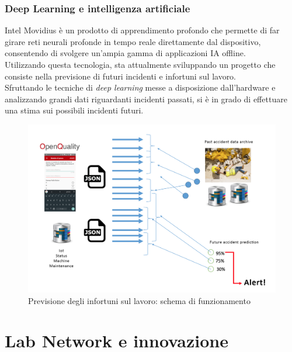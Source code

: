 \subsubsection{Deep Learning e intelligenza artificiale}
Intel Movidius è un prodotto di apprendimento profondo che permette di far girare reti neurali profonde in tempo reale direttamente dal dispositivo, consentendo di svolgere un'ampia gamma di applicazioni IA offline.\\
Utilizzando questa tecnologia, \lab{} sta attualmente sviluppando un progetto che consiste nella previsione di futuri incidenti e infortuni sul lavoro.\\
Sfruttando le tecniche di \textit{deep learning} messe a disposizione dall'hardware e analizzando grandi dati riguardanti incidenti passati, si è in grado di effettuare una stima sui possibili incidenti futuri.
\begin{figure}[H]
	\begin{center}
	\includegraphics[scale=0.25]{immagini/accident_prediction.png}
	\caption{Previsione degli infortuni sul lavoro: schema di funzionamento}
	\end{center}
\end{figure}

\section{Lab Network e innovazione}
